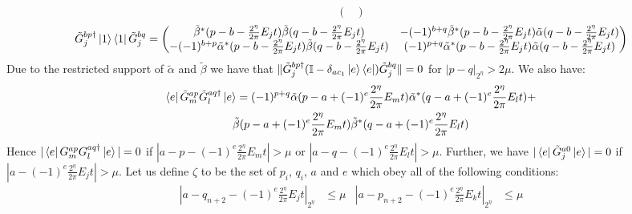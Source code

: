 \documentclass[aps,floatfix,10pt,amssymb,amsfont,amsmath,superscriptaddress,float,nofootinbib,longbibliography,nobalancelastpage,twocolumn]{revtex4-2}
\begin{document}
\begin{widetext}
\begin{equation}
\begin{pmatrix}
    \end{pmatrix}
\end{equation} 
\begin{equation}
    \tilde G^{bp\dagger}_{j}\ket{1}\bra{1} \tilde G^{bq}_{j} = \begin{pmatrix}
        \tilde \beta^*(p-b-\frac{2^{\eta}}{2\pi}E_{j}t)\tilde  \beta(q-b-\frac{2^{\eta}}{2\pi}E_{j}t) &  -(-1)^{b+q}\tilde  \beta^*(p-b-\frac{2^{\eta}}{2\pi}E_{j}t)\tilde \alpha(q-b-\frac{2^{\eta}}{2\pi}E_{j}t) \\
        -(-1)^{b+p}\tilde  \alpha^*(p-b-\frac{2^{\eta}}{2\pi}E_{j}t)\tilde  \beta(q-b-\frac{2^{\eta}}{2\pi}E_{j}t) & (-1)^{p+q}\tilde  \alpha^*(p-b-\frac{2^{\eta}}{2\pi}E_{j}t)\tilde \alpha(q-b-\frac{2^{\eta}}{2\pi}E_{j}t)
    \end{pmatrix}
\end{equation} 
Due to the restricted support of $\tilde \alpha$ and $\tilde \beta$ we have that $\|\tilde G^{bp\dagger}_{j}(\mathbb{I} - \delta_{ac_1}\ket{e}\bra{e})\tilde G^{bq}_{j}\| = 0$ for $|p-q|_{2^{\eta}} > 2\mu$. We also have:
\begin{multline}
    \bra{e}\tilde G^{ap}_m\tilde G^{aq\dagger}_l\ket{e} = (-1)^{p+q}\tilde \alpha(p - a + (-1)^e\frac{2^{\eta}}{2\pi}E_{m}t)\tilde  \alpha^*(q - a + (-1)^e\frac{2^{\eta}}{2\pi}E_{l}t) +\\ \tilde \beta(p - a + (-1)^e\frac{2^{\eta}}{2\pi}E_{m}t)\tilde  \beta^*(q - a + (-1)^e\frac{2^{\eta}}{2\pi}E_{l}t)
\end{multline}
Hence $|\bra{e}G^{ap}_mG^{aq\dagger}_l\ket{e}| = 0$ if $|a-p-(-1)^e\frac{2^{\eta}}{2\pi}E_{m}t| > \mu$ or $|a-q-(-1)^e\frac{2^{\eta}}{2\pi}E_{l}t| > \mu$. Further, we have $|\bra{e}\tilde G^{a0}_j \ket{e}| = 0$ if $|a-(-1)^e\frac{2^{\eta}}{2\pi}E_{j}t| > \mu$. Let us define $\zeta$ to be the set of $p_i$, $q_i$, $a$ and $e$ which obey all of the following conditions:
\begin{equation}
\begin{aligned}
    |a-q_{n+2}-(-1)^e\frac{2^{\eta}}{2\pi}E_jt|_{2^{\eta}} &\leq \mu  &|a-p_{n+2}-(-1)^e\frac{2^{\eta}}{2\pi}E_kt|_{2^{\eta}} &\leq \mu\\

\end{aligned}
\end{equation}
\end{widetext}
\end{document}
